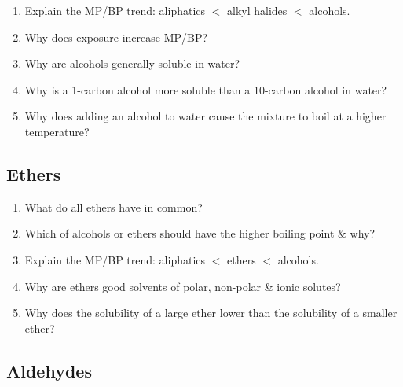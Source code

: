 \documentclass[12pt]{article}
\begin{document}
\newpage

\begin{enumerate}[label=\arabic*., start=6]
    \item Explain the MP/BP trend: aliphatics $<$ alkyl halides $<$ alcohols.
    \vspace{1.5cm}
    \item Why does exposure increase MP/BP?
    \vspace{1.5cm}
    \item Why are alcohols generally soluble in water?
    \vspace{1.5cm}
    \item Why is a 1-carbon alcohol more soluble than a 10-carbon alcohol in water?
    \vspace{1.5cm}
    \item Why does adding an alcohol to water cause the mixture to boil at a higher temperature?
    \vspace{1.5cm}
\end{enumerate}

\begin{center}
    \subsection*{Ethers}
\end{center}

\begin{enumerate}[label=\arabic*.]
    \item What do all ethers have in common?
    \vspace{1.5cm}
    \item Which of alcohols or ethers should have the higher boiling point \& why?
    \vspace{1.5cm}
    \item Explain the MP/BP trend: aliphatics $<$ ethers $<$ alcohols.
    \vspace{1.5cm}
    \item Why are ethers good solvents of polar, non-polar \& ionic solutes?
    \vspace{1.5cm}
    \item Why does the solubility of a large ether lower than the solubility of a smaller ether?
    \vspace{1.5cm}
\end{enumerate}

\begin{center}
    \subsection*{Aldehydes}
\end{center}
\end{document}
